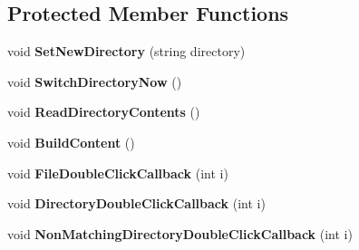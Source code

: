 \subsection*{Protected Member Functions}
\begin{DoxyCompactItemize}
\item 
\mbox{\label{class_lerp2_a_p_i_editor_1_1_utility_1_1_file_browser_editor_a5ba3763af8aed1eb77b3250707978d93}} 
void {\bfseries Set\+New\+Directory} (string directory)
\item 
\mbox{\label{class_lerp2_a_p_i_editor_1_1_utility_1_1_file_browser_editor_ad64538e2dd0a356c0740e978ba2f5509}} 
void {\bfseries Switch\+Directory\+Now} ()
\item 
\mbox{\label{class_lerp2_a_p_i_editor_1_1_utility_1_1_file_browser_editor_ad3a37b62683da556a3570b60fa0234bb}} 
void {\bfseries Read\+Directory\+Contents} ()
\item 
\mbox{\label{class_lerp2_a_p_i_editor_1_1_utility_1_1_file_browser_editor_a5c21cf6853b07554ef1ff2e70371c11c}} 
void {\bfseries Build\+Content} ()
\item 
\mbox{\label{class_lerp2_a_p_i_editor_1_1_utility_1_1_file_browser_editor_af4b12af3787fa239a7aa33b639030b63}} 
void {\bfseries File\+Double\+Click\+Callback} (int i)
\item 
\mbox{\label{class_lerp2_a_p_i_editor_1_1_utility_1_1_file_browser_editor_a29120c2f32d629e3b02b7fe83110c513}} 
void {\bfseries Directory\+Double\+Click\+Callback} (int i)
\item 
\mbox{\label{class_lerp2_a_p_i_editor_1_1_utility_1_1_file_browser_editor_a815b97f451609a09e1ee0c784373d8e3}} 
void {\bfseries Non\+Matching\+Directory\+Double\+Click\+Callback} (int i)
\end{DoxyCompactItemize}
